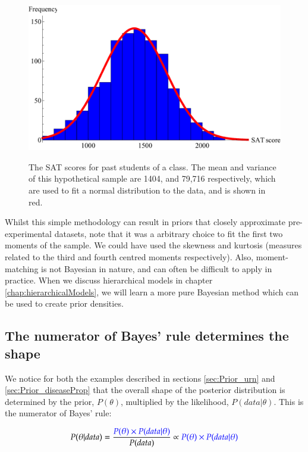 \documentclass[11pt,fullpage]{book}
\begin{document}
\begin{figure}
\centering
\scalebox{0.75} 
{\includegraphics{Prior_SATScoresHistogram.pdf}}\caption{The SAT scores for past students of a class. The mean and variance of this hypothetical sample are 1404, and 79,716 respectively, which are used to fit a normal distribution to the data, and is shown in red.}\label{fig:Prior_SATScoresHistogram}
\end{figure}


Whilst this simple methodology can result in priors that closely approximate pre-experimental datasets, note that it was a arbitrary choice to fit the first two moments of the sample. We could have used the skewness and kurtosis (measures related to the third and fourth centred moments respectively). Also, moment-matching is not Bayesian in nature, and can often be difficult to apply in practice. When we discuss hierarchical models in chapter \ref{chap:hierarchicalModels}, we will learn a more pure Bayesian method which can be used to create prior densities.

\subsection{The numerator of Bayes' rule determines the shape}\label{sec:Prior_numerator}
We notice for both the examples described in sections \ref{sec:Prior_urn} and \ref{sec:Prior_diseaseProp} that the overall shape of the posterior distribution is determined by the prior, $P(\theta)$, multiplied by the likelihood, $P(data|\theta)$. This is the numerator of Bayes' rule:

\begin{equation}
P(\theta|data) = \frac{{\color{blue}P(\theta)\times P(data|\theta)}}{P(data)} \propto {\color{blue}P(\theta)\times P(data|\theta)}
\end{equation}\label{eq:Prior_BayesNumerator}
\end{document}
